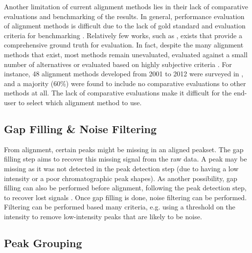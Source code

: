 Another limitation of current alignment methods lies in their lack of comparative evaluations and benchmarking of the results. In general, performance evaluation of alignment methods is difficult due to the lack of gold standard and evaluation criteria for benchmarking \cite{Castillo2011,Smith2013a}. Relatively few works, such as \cite{Lange2008}, exists that provide a comprehensive ground truth for evaluation. In fact, despite the many alignment methods that exist, most methods remain unevaluated, evaluated against a small number of alternatives or evaluated based on highly subjective criteria \cite{Smith2013}. For instance, 48 alignment methods developed from 2001 to 2012 were surveyed in \cite{Smith2013a}, and a majority (60\%) were found to include no comparative evaluations to other methods at all. The lack of comparative evaluations make it difficult for the end-user to select which alignment method to use.


\subsection{Gap Filling \& Noise Filtering}

From alignment, certain peaks might be missing in an aligned peakset. The gap filling step aims to recover this missing signal from the raw data. A peak may be missing as it was not detected in the peak detection step (due to having a low intensity or a poor chromatographic peak shapes). As another possibility, gap filling can also be performed before alignment, following the peak detection step, to recover lost signals \cite{benton2010correction}. Once gap filling is done, noise filtering can be performed. Filtering can be performed based many criteria, e.g. using a threshold on the intensity to remove low-intensity peaks that are likely to be noise.

\subsection{Peak Grouping\label{sub:grouping-background}}

